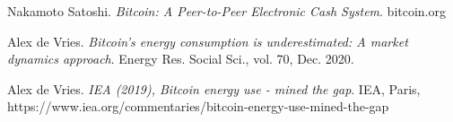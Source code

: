 \documentclass[a4paper]{article}
\begin{document}

\begin{thebibliography}{9}

 Nakamoto Satoshi. \emph{Bitcoin: A Peer-to-Peer Electronic Cash System}. bitcoin.org

 Alex de Vries. \emph{Bitcoin’s energy consumption is underestimated: A market dynamics approach}. Energy Res. Social Sci., vol. 70, Dec. 2020.

 Alex de Vries. \emph{IEA (2019), Bitcoin energy use - mined the gap}.  IEA, Paris, https://www.iea.org/commentaries/bitcoin-energy-use-mined-the-gap 



\end{thebibliography}
\end{document}

